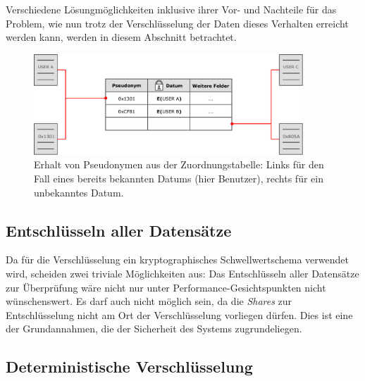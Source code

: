 Verschiedene Lösungmöglichkeiten inklusive ihrer Vor- und Nachteile für das Problem, wie nun trotz der Verschlüsselung der Daten dieses Verhalten erreicht werden kann, werden in diesem Abschnitt betrachtet.

\begin{figure}[]
    \centering
        \includegraphics[width=0.9\textwidth]{dia/se_overview.pdf}
    \caption{Erhalt von Pseudonymen aus der Zuordnungstabelle: Links für den Fall eines bereits bekannten Datums (hier Benutzer), rechts für ein unbekanntes Datum.}
    \label{fig:se_overview}
\end{figure}

\subsection{Entschlüsseln aller Datensätze}

Da für die Verschlüsselung ein kryptographisches Schwellwertschema verwendet wird, scheiden zwei triviale Möglichkeiten aus: Das Entschlüsseln aller Datensätze zur Überprüfung wäre nicht nur unter Performance-Gesichtspunkten nicht wünschenswert. Es darf auch nicht möglich sein, da die \textit{Shares} zur Entschlüsselung nicht am Ort der Verschlüsselung vorliegen dürfen. Dies ist eine der Grundannahmen, die der Sicherheit des Systems zugrundeliegen. 

\subsection{Deterministische Verschlüsselung}
\label{sec_state_se_deterministic}

